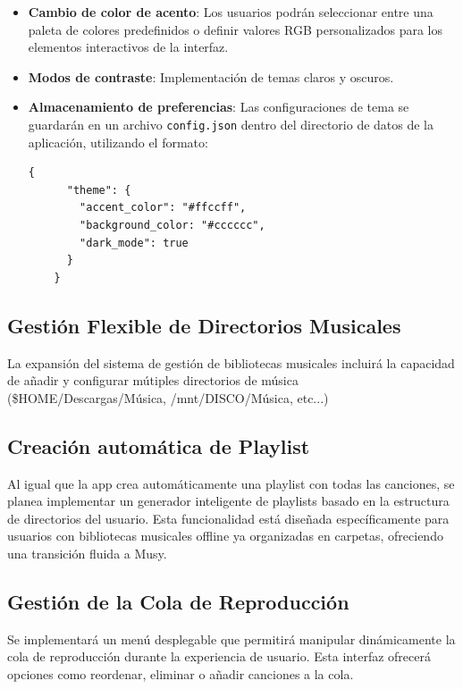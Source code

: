 \documentclass[11pt, a4paper]{article}
\begin{document}
  \begin{itemize}
    \item \textbf{Cambio de color de acento}: Los usuarios podrán seleccionar entre una paleta de colores predefinidos o definir valores RGB personalizados para los elementos interactivos de la interfaz.

    \item \textbf{Modos de contraste}: Implementación de temas claros y oscuros.

    \item \textbf{Almacenamiento de preferencias}: Las configuraciones de tema se guardarán en un archivo \texttt{config.json} dentro del directorio de datos de la aplicación, utilizando el formato:

    \begin{lstlisting}[caption={config.json}]
    {
      "theme": {
        "accent_color": "#ffccff",
        "background_color: "#cccccc",
        "dark_mode": true
      }
    }
    \end{lstlisting}

  \end{itemize}

  \subsection{Gestión Flexible de Directorios Musicales}

  La expansión del sistema de gestión de bibliotecas musicales incluirá la capacidad de añadir y configurar mútiples directorios de música (\$HOME/Descargas/Música, /mnt/DISCO/Música, etc...)

  \subsection{Creación automática de Playlist}

  Al igual que la app crea automáticamente una playlist con todas las canciones, se planea implementar un generador inteligente de playlists basado en la estructura de directorios del usuario. Esta funcionalidad está diseñada específicamente para usuarios con bibliotecas musicales offline ya organizadas en carpetas, ofreciendo una transición fluida a Musy.

  \subsection{Gestión de la Cola de Reproducción}

  Se implementará un menú desplegable que permitirá manipular dinámicamente la cola de reproducción durante la experiencia de usuario. Esta interfaz ofrecerá opciones como reordenar, eliminar o añadir canciones a la cola.
\end{document}
